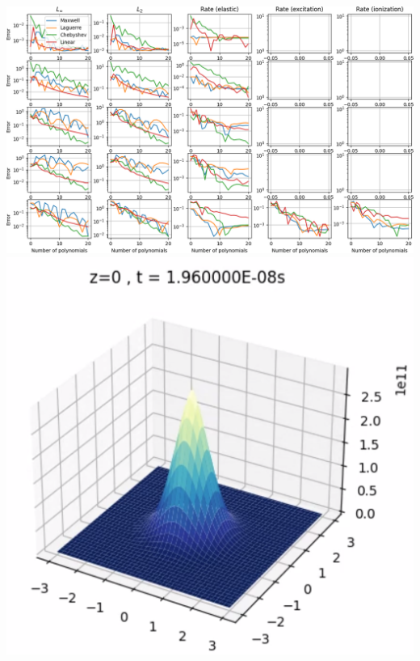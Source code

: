 \documentclass[mathserif, aspectratio=169]{beamer}
\begin{document}
\begin{frame}
{\begin{columns}[T]
\begin{column}{.71\linewidth}
\begin{columns}[T]
\begin{column}{.5\linewidth}
\begin{center}
\vspace{-0.2in}
\includegraphics[width=.99\textwidth]{figures/bolsig_convergence.png}
\includegraphics[width=.5\textwidth]{figures/code.png}
\end{center}
\end{column}
\end{columns}
\end{column}
\end{columns}
}
%
\end{frame}
\end{document}
